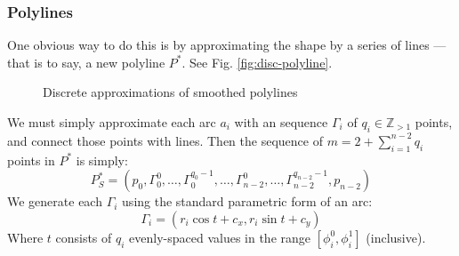 \documentclass{article}
\begin{document}
\subsubsection{Polylines}
%
One obvious way to do this is by approximating the shape by a series of lines --- that is to say, a new polyline $P^*$.  See Fig. \ref{fig:disc-polyline}.
%
\begin{figure}
  \centering
  \hfill
  \caption{Discrete approximations of smoothed polylines}
\end{figure}
%
We must simply approximate each arc $a_i$ with an sequence $\Gamma_i$ of $q_i \in \mathbb{Z}_{>1}$ points, and connect those points with lines.  Then the sequence of $m = 2 + \sum^{n-2}_{i=1} q_i$ points in $P^*$ is simply:
%
\begin{equation}
  \label{eq:p-star}
  P^*_S = \left(p_0, \Gamma^0_0, \ldots, \Gamma^{q_0-1}_0, \ldots, \Gamma^{0}_{n-2}, \ldots, \Gamma^{q_{n-2}-1}_{n-2},  p_{n-2}\right)
\end{equation}
%
We generate each $\Gamma_i$ using the standard parametric form of an arc:
%
\begin{equation}
  \label{eq:arc-segments}
  \Gamma_i = \left(r_i \cos t + c_x, r_i \sin t + c_y\right)
\end{equation}
%
Where $t$ consists of $q_i$ evenly-spaced values in the range $\left[\phi^0_i, \phi^1_i\right]$ (inclusive).
%
\end{document}
